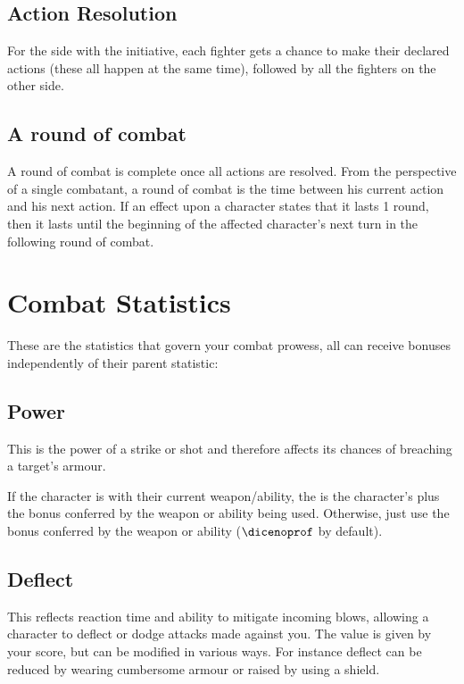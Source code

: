 \documentclass[a4paper,10pt,oneside]{book}
\newcommand{\textlf}[1]{\textbf{\titlecap{#1}}}
\begin{document}
\subsection{Action Resolution}
For the side with the initiative, each fighter gets a chance to make their declared actions (these all happen at the same time), followed by all the fighters on the other side.  

\subsection{A round of combat}
A round of combat is complete once all actions are resolved. From the perspective of a single combatant, a round of combat is the time between his current action and his next action. If an effect upon a character states that it lasts 1 round, then it lasts until the beginning of the affected character's next turn in the following round of combat.


\section{Combat Statistics}
\label{sec:comstat}
These are the statistics that govern your combat prowess, all can receive bonuses independently of their parent statistic:

\subsection{Power}
This is the power of a strike or shot and therefore affects its chances of breaching a target's armour. 

If the character is \textlf{proficient} with their current weapon/ability, the \textlf{Power} is the character's \textlf{might} plus the bonus conferred by the weapon or ability being used. Otherwise, just use the bonus conferred by the weapon or ability ($\dicenoprof$ by default).

\subsection{Deflect}
This reflects reaction time and ability to mitigate incoming blows, allowing a character to deflect or dodge attacks made against you. The value is given by your \textlf{Cunning} score, but can be modified in various ways. For instance deflect can be reduced by wearing cumbersome armour or raised by using a shield.
\end{document}
